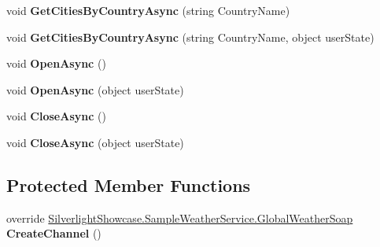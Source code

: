 \begin{DoxyCompactItemize}
\item 
\hypertarget{class_silverlight_showcase_1_1_sample_weather_service_1_1_global_weather_soap_client_a71a3976c46e0e803245c3943008183bd}{
void {\bfseries GetCitiesByCountryAsync} (string CountryName)}
\label{class_silverlight_showcase_1_1_sample_weather_service_1_1_global_weather_soap_client_a71a3976c46e0e803245c3943008183bd}

\item 
\hypertarget{class_silverlight_showcase_1_1_sample_weather_service_1_1_global_weather_soap_client_a1ececfd1f8761d9060a5568084968aaa}{
void {\bfseries GetCitiesByCountryAsync} (string CountryName, object userState)}
\label{class_silverlight_showcase_1_1_sample_weather_service_1_1_global_weather_soap_client_a1ececfd1f8761d9060a5568084968aaa}

\item 
\hypertarget{class_silverlight_showcase_1_1_sample_weather_service_1_1_global_weather_soap_client_ab377a17e226bdb3cb0698cd3cf98eaf6}{
void {\bfseries OpenAsync} ()}
\label{class_silverlight_showcase_1_1_sample_weather_service_1_1_global_weather_soap_client_ab377a17e226bdb3cb0698cd3cf98eaf6}

\item 
\hypertarget{class_silverlight_showcase_1_1_sample_weather_service_1_1_global_weather_soap_client_a14b23f3686347d082f8e49ec1ffbd58b}{
void {\bfseries OpenAsync} (object userState)}
\label{class_silverlight_showcase_1_1_sample_weather_service_1_1_global_weather_soap_client_a14b23f3686347d082f8e49ec1ffbd58b}

\item 
\hypertarget{class_silverlight_showcase_1_1_sample_weather_service_1_1_global_weather_soap_client_a02c1f2f7ccf4507d82ad049926ad0bf8}{
void {\bfseries CloseAsync} ()}
\label{class_silverlight_showcase_1_1_sample_weather_service_1_1_global_weather_soap_client_a02c1f2f7ccf4507d82ad049926ad0bf8}

\item 
\hypertarget{class_silverlight_showcase_1_1_sample_weather_service_1_1_global_weather_soap_client_a72167edc8b02c27b25d0724007ccf752}{
void {\bfseries CloseAsync} (object userState)}
\label{class_silverlight_showcase_1_1_sample_weather_service_1_1_global_weather_soap_client_a72167edc8b02c27b25d0724007ccf752}

\end{DoxyCompactItemize}
\subsection*{Protected Member Functions}
\begin{DoxyCompactItemize}
\item 
\hypertarget{class_silverlight_showcase_1_1_sample_weather_service_1_1_global_weather_soap_client_a2b799501d5ae966f3448e08c2b8f6674}{
override \hyperlink{interface_silverlight_showcase_1_1_sample_weather_service_1_1_global_weather_soap}{SilverlightShowcase.SampleWeatherService.GlobalWeatherSoap} {\bfseries CreateChannel} ()}
\label{class_silverlight_showcase_1_1_sample_weather_service_1_1_global_weather_soap_client_a2b799501d5ae966f3448e08c2b8f6674}

\end{DoxyCompactItemize}
